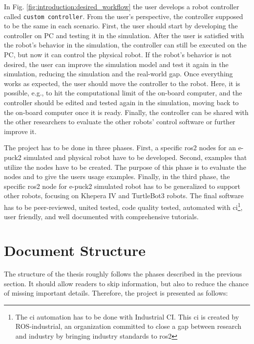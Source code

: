 In Fig. \ref{fig:introduction:desired_workflow} the user develops a robot controller called \texttt{custom controller}.
From the user's perspective, the controller supposed to be the same in each scenario.
First, the user should start by developing the controller on PC and testing it in the simulation.
After the user is satisfied with the robot's behavior in the simulation, the controller can still be executed on the PC, but now it can control the physical robot.
If the robot's behavior is not desired, the user can improve the simulation model and test it again in the simulation, reducing the simulation and the real-world gap.
Once everything works as expected, the user should move the controller to the robot.
Here, it is possible, e.g., to hit the computational limit of the on-board computer, and the controller should be edited and tested again in the simulation, moving back to the on-board computer once it is ready.
Finally, the controller can be shared with the other researchers to evaluate the other robots' control software or further improve it.

The project has to be done in three phases.
First, a specific \ac{ros2} nodes for an e-puck2 simulated and physical robot have to be developed.
Second, examples that utilize the nodes have to be created. 
The purpose of this phase is to evaluate the nodes and to give the users usage examples.
Finally, in the third phase, the specific \ac{ros2} node for e-puck2 simulated robot has to be generalized to support other robots, focusing on Khepera IV and TurtleBot3 robots.
The final software has to be peer-reviewed, united tested, code quality tested, automated with \ac{ci}\footnote{The \ac{ci} automation has to be done with Industrial CI. This \ac{ci} is created by ROS-industrial, an organization committed to close a gap between research and industry by bringing industry standards to \ac{ros2}}, user friendly, and well documented with comprehensive tutorials.

\section{Document Structure}

The structure of the thesis roughly follows the phases described in the previous section.
It should allow readers to skip information, but also to reduce the chance of missing important details.
Therefore, the project is presented as follows:

